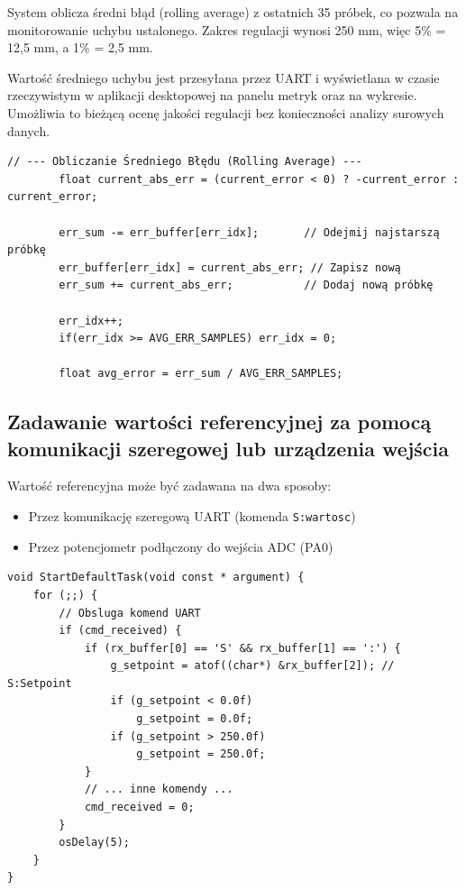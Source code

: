 \documentclass[11pt]{article}
\begin{document}
System oblicza średni błąd (rolling average) z ostatnich 35 próbek, co pozwala na monitorowanie uchybu ustalonego. Zakres regulacji wynosi 250 mm, więc 5\% = 12,5 mm, a 1\% = 2,5 mm.

Wartość średniego uchybu jest przesyłana przez UART i wyświetlana w czasie rzeczywistym w aplikacji desktopowej na panelu metryk oraz na wykresie. Umożliwia to bieżącą ocenę jakości regulacji bez konieczności analizy surowych danych.

\begin{lstlisting}[caption={Obliczenie uchybu z 35 (main.c)}, style=cstyle]
// --- Obliczanie Średniego Błędu (Rolling Average) ---
		float current_abs_err = (current_error < 0) ? -current_error : current_error;
		
		err_sum -= err_buffer[err_idx];       // Odejmij najstarszą próbkę
		err_buffer[err_idx] = current_abs_err; // Zapisz nową
		err_sum += current_abs_err;           // Dodaj nową próbkę
		
		err_idx++;
		if(err_idx >= AVG_ERR_SAMPLES) err_idx = 0;
		
		float avg_error = err_sum / AVG_ERR_SAMPLES;
\end{lstlisting}

\subsection{Zadawanie wartości referencyjnej za pomocą komunikacji szeregowej lub urządzenia wejścia}

Wartość referencyjna może być zadawana na dwa sposoby:
\begin{itemize}
    \item Przez komunikację szeregową UART (komenda \texttt{S:wartosc})
    \item Przez potencjometr podłączony do wejścia ADC (PA0)
\end{itemize}

\begin{lstlisting}[caption={Obsługa komendy setpointu przez UART (main.c)}, style=cstyle]
void StartDefaultTask(void const * argument) {
    for (;;) {
        // Obsluga komend UART
        if (cmd_received) {
            if (rx_buffer[0] == 'S' && rx_buffer[1] == ':') {
                g_setpoint = atof((char*) &rx_buffer[2]); // S:Setpoint
                if (g_setpoint < 0.0f)
                    g_setpoint = 0.0f;
                if (g_setpoint > 250.0f)
                    g_setpoint = 250.0f;
            }
            // ... inne komendy ...
            cmd_received = 0;
        }
        osDelay(5);
    }
}
\end{lstlisting}
\end{document}
